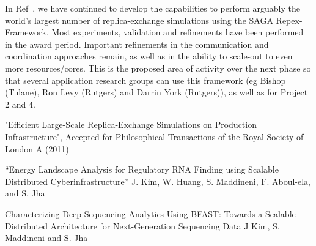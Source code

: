 \documentclass[a4paper,10pt]{article}
\begin{document}
In Ref~\cite{async-re}, we have continued to develop the capabilities to perform arguably the world's largest number of replica-exchange simulations using the SAGA Repex-Framework. Most experiments, validation and refinements have been performed in the award period. Important refinements in the communication and coordination approaches remain, as well as in the ability to scale-out to even more resources/cores. This is the proposed area of activity over the next phase so that several application research groups can use this framework (eg Bishop (Tulane), Ron Levy (Rutgers) and Darrin York (Rutgers)), as well as for Project 2 and 4.

\begin{thebibliography}{9}


 "Efficient Large-Scale Replica-Exchange Simulations on Production Infrastructure", Accepted for Philosophical Transactions of the Royal Society of London A (2011)

 ``Energy Landscape Analysis for Regulatory RNA Finding using
Scalable Distributed Cyberinfrastructure''
J. Kim, W. Huang, S. Maddineni, F. Aboul-ela, and S. Jha

 Characterizing Deep Sequencing Analytics Using BFAST: Towards a Scalable Distributed Architecture for Next-Generation Sequencing Data J Kim, S. Maddineni and S. Jha

\end{thebibliography}
\end{document}
